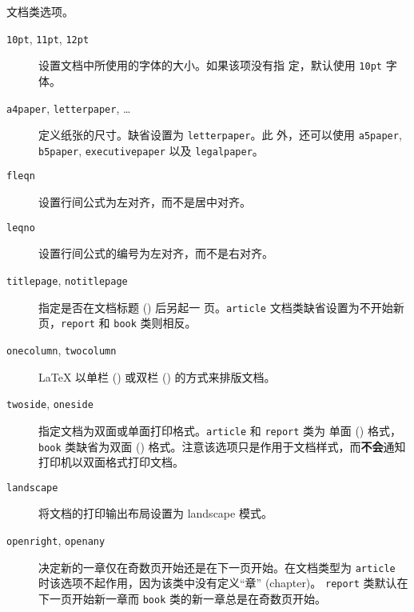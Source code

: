 \begin{table}[!bp]
\caption{文档类选项。} \label{options}
\begin{lined}{\textwidth}
\begin{flushleft}
\begin{description}
\item[\normalfont\texttt{10pt}, \texttt{11pt}, \texttt{12pt}] \quad 设置文档中所使用的字体的大小。如果该项没有指
  定，默认使用 \texttt{10pt} 字体。
\item[\normalfont\texttt{a4paper}, \texttt{letterpaper}, \ldots] \quad 定义纸张的尺寸。缺省设置为 \texttt{letterpaper}。此
  外，还可以使用 \texttt{a5paper}, \texttt{b5paper}, \texttt{executivepaper} 以及 \texttt{legalpaper}。
   

\item[\normalfont\texttt{fleqn}] \quad 设置行间公式为左对齐，而不是居中对齐。

\item[\normalfont\texttt{leqno}] \quad
设置行间公式的编号为左对齐，而不是右对齐。

\item[\normalfont\texttt{titlepage}, \texttt{notitlepage}] \quad 指定是否在文档标题 () 后另起一
  页。\texttt{article} 文档类缺省设置为不开始新页，\texttt{report} 和 \texttt{book} 类则相反。

\item[\normalfont\texttt{onecolumn}, \texttt{twocolumn}] \quad
  \LaTeX{} 以单栏 () 或双栏 () 的方式来排版文档。

\item[\normalfont\texttt{twoside}, \texttt{oneside}] \quad 指定文档为双面或单面打印格式。\texttt{article} 和 \texttt{report} 类为
  单面 () 格式，\texttt{book} 类缺省为双面 () 格式。注意该选项只是作用于文档样式，而\textbf{不会}通知打印机以双面格式打印文档。

\item[\normalfont\texttt{landscape}] \quad
将文档的打印输出布局设置为 landscape 模式。

\item[\normalfont\texttt{openright}, \texttt{openany}] \quad 决定新的一章仅在奇数页开始还是在下一页开始。在文档类型为 \texttt{article} 时该选项不起作用，因为该类中没有定义“章” (chapter)。 \texttt{report} 类默认在下一页开始新一章而 \texttt{book} 类的新一章总是在奇数页开始。

\end{description}
\end{flushleft}
\end{lined}
\end{table}

